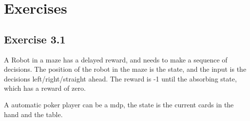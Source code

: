 \section{Exercises}

\subsection{Exercise 3.1}
A Robot in a maze has a delayed reward, and needs to make a sequence of decisions. The position of the robot in the maze is the state, and the input is the decisions left/right/straight ahead. The reward is -1 until the absorbing state, which has a reward of zero.

A automatic poker player can be a mdp, the state is the current cards in the hand and the table. 